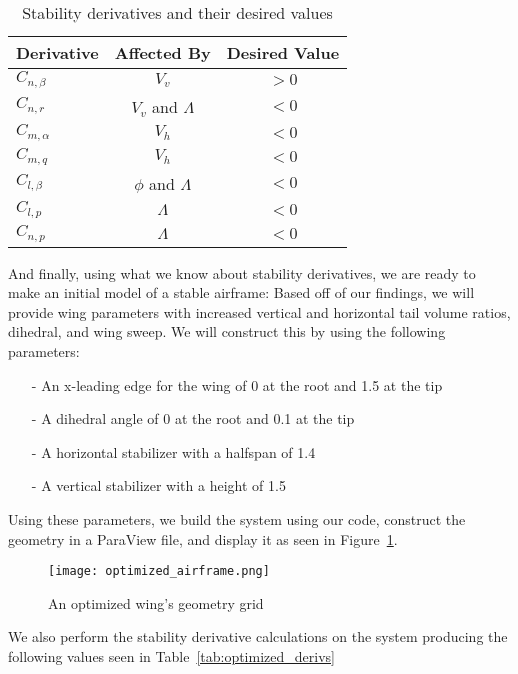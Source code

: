 \documentclass{article}
\begin{document}
\begin{table}[H]
    \centering
    \caption{Stability derivatives and their desired values}\label{tab:stability}
    \begin{tabular}{l c c}
        \toprule
        \textbf{Derivative} & \textbf{Affected By} & \textbf{Desired Value}\\
        \midrule
        $C_{n,\beta}$ & $V_v$  & $ > 0$ \\
        $C_{n,r}$ & $V_v$ and $\Lambda$ & $ < 0$ \\
        $C_{m,\alpha}$ & $V_h$ & $ < 0$ \\
        $C_{m,q}$ & $V_h$ & $ < 0$ \\
        $C_{l,\beta}$ & $\phi$ and $\Lambda$ & $ < 0$ \\
        $C_{l,p}$ & $\Lambda$ & $ < 0$\\
        $C_{n,p}$ & $\Lambda$ & $ < 0$\\
        \bottomrule
    \end{tabular}
\end{table}

And finally, using what we know about stability derivatives, we are ready to make an initial model of a stable airframe:
Based off of our findings, we will provide wing parameters with increased vertical and horizontal tail volume ratios, dihedral, and wing sweep.
We will construct this by using the following parameters: 
\begin{itemize}
    \item[-] An x-leading edge for the wing of 0 at the root and 1.5 at the tip
    \item[-] A dihedral angle of 0 at the root and 0.1 at the tip
    \item[-] A horizontal stabilizer with a halfspan of 1.4
    \item[-] A vertical stabilizer with a height of 1.5
\end{itemize}

Using these parameters, we build the system using our code, construct the geometry in a ParaView file, and display it as seen in Figure~\ref{fig:optimized}.

\begin{figure}[H]
    \centering
    \texttt{[image: optimized\_airframe.png]}
    \caption{An optimized wing's geometry grid}\label{fig:optimized}
\end{figure}

We also perform the stability derivative calculations on the system producing the following values seen in Table~\ref{tab:optimized_derivs}
\end{document}
